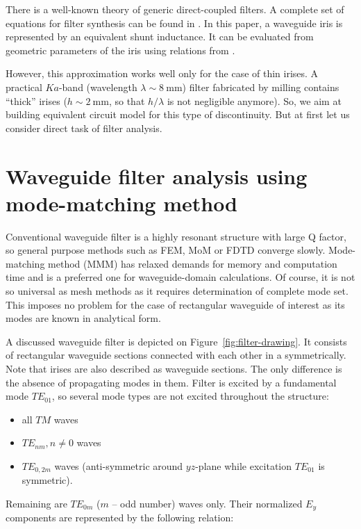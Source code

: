 \documentclass{pj}
\begin{document}
There is a well-known theory of generic direct-coupled filters. A
complete set of equations for filter synthesis can be found in
\cite{cohn1957}. In this paper, a waveguide iris is represented by an
equivalent shunt inductance. It can be evaluated from geometric
parameters of the iris using relations from \cite{matthaei1980}.

However, this approximation works well only for the case of thin
irises. A practical $Ka$-band (wavelength
$\lambda \sim 8~\mathrm{mm}$) filter fabricated by milling contains
``thick'' irises ($h \sim 2~\mathrm{mm}$, so that $h/\lambda$ is not
negligible anymore). So, we aim at building equivalent circuit model
for this type of discontinuity. But at first let us consider direct
task of filter analysis.

\section{Waveguide filter analysis using mode-matching method}
\label{sec:mode-matching-method}

Conventional waveguide filter is a highly resonant structure with
large Q factor, so general purpose methods such as FEM, MoM or FDTD
converge slowly. Mode-matching method (MMM) has relaxed demands for
memory and computation time and is a preferred one for
waveguide-domain calculations. Of course, it is not so universal as
mesh methods as it requires determination of complete mode
set. This imposes no problem for the case of rectangular waveguide of
interest as its modes are known in analytical form.

A discussed waveguide filter is depicted on
Figure~\ref{fig:filter-drawing}. It consists of rectangular waveguide
sections connected with each other in a symmetrically. Note that
irises are also described as waveguide sections. The only difference
is the absence of propagating modes in them. Filter is excited by a
fundamental mode $TE_{01}$, so several mode types are not excited
throughout the structure:

\begin{itemize}
\item all $TM$ waves  
\item $TE_{nm}, n \ne 0$ waves 
\item $TE_{0, 2m}$ waves (anti-symmetric around $yz$-plane while
  excitation $TE_{01}$ is symmetric).
\end{itemize}

Remaining are $TE_{0m}$ ($m$ -- odd number) waves only. Their
normalized $E_{y}$ components are represented by the following
relation:
\end{document}
